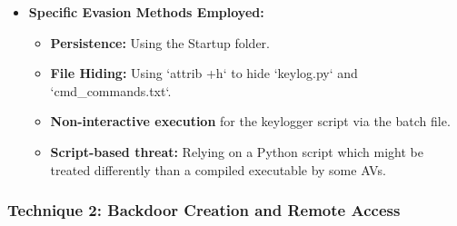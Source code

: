 \documentclass[11pt]{article}
\begin{document}
\begin{itemize}
		\item \textbf{Specific Evasion Methods Employed:}
		\begin{itemize}
			\item \textbf{Persistence:} Using the Startup folder.
			\item \textbf{File Hiding:} Using `attrib +h` to hide `keylog.py` and `cmd\_commands.txt`.
			\item \textbf{Non-interactive execution} for the keylogger script via the batch file.
			\item \textbf{Script-based threat:} Relying on a Python script which might be treated differently than a compiled executable by some AVs.
		\end{itemize}
	\end{itemize}
	
	\subsubsection{Technique 2: Backdoor Creation and Remote Access}
\end{document}
